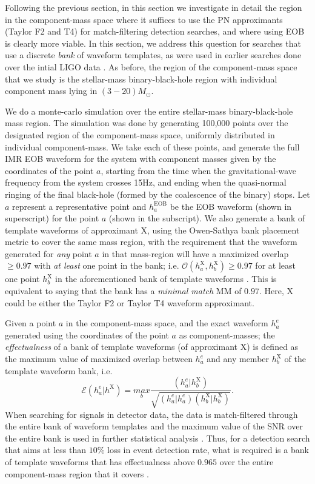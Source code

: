 \documentclass[aps,
prd,
amsmath,
amssymb,
twocolumn,
floatfix,
groupedaddress]{revtex4-1}
\newcommand{\EOB}{\mathrm{EOB}}
\newcommand{\Olap}{\mathcal{O}}
\newcommand{\X}{\mathrm{X}}
\begin{document}
Following the previous section, in this section we investigate in detail the region in the component-mass space where it suffices to use the PN approximants (Taylor F2 and T4) for match-filtering detection searches, and where using EOB is clearly more viable. In this section, we address this question for searches that use a discrete \textit{bank} \citep{SathyaBankPlacementTauN,SathyaMetric2PN} of waveform templates, as were used in earlier searches done over the intial LIGO data \citep{LSCSearch2004,LSCSearch2005,LSCSearch2008}. As before, the region of the component-mass space that we study is the stellar-mass binary-black-hole region with individual component mass lying in $(3-20)M_{\odot}$.

We do a monte-carlo simulation over the entire stellar-mass binary-black-hole mass region. The simulation was done by generating 100,000 points over the designated region of the component-mass space, uniformly distributed in individual component-mass. We take each of these points, and generate the full IMR EOB waveform for the system with component masses given by the coordinates of the point $a$, starting from the time when the gravitational-wave frequency from the system crosses 15Hz, and ending when the quasi-normal ringing of the final black-hole (formed by the coalescence of the binary) stops. Let $a$ represent a representative point and $h_a^{\EOB}$ be the EOB waveform (shown in superscript) for the point $a$ (shown in the subscript). We also generate a bank of template waveforms of approximant $\X$, using the Owen-Sathya bank placement metric \citep{OwenTemplateSpacing,SathyaBankPlacementTauN,SathyaMetric2PN} to cover the same mass region, with the requirement that the waveform generated for \textit{
any} point $a$ in that mass-region will have a maximized overlap $\geq 0.97$ with \textit{at least} one point in the bank; i.e. $\Olap(h^{\X}_a,h^{\X}_b)\geq 0.97$ for at least one point $h^{\X}_b$ in the aforementioned bank of template waveforms . This is equivalent to saying that the bank has a \textit{minimal match} $\mathrm{MM}$ of $0.97$. Here, $\X$ could be either the Taylor F2 or Taylor T4 waveform approximant.

Given a point $a$ in the component-mass space, and the exact waveform $h^e_a$ generated using the coordinates of the point $a$ as component-masses; the \textit{effectualness} of a bank of template waveforms (of approximant $\X$) is defined as the maximum value of maximized overlap between $h^e_a$ and any member $h^{\X}_b$ of the template waveform bank, i.e.
\begin{equation}
\mathcal{E}(h^e_a|h^{\X}) = \underset{b}{max}\dfrac{(h^e_a|h^{\X}_b)}{\sqrt{(h^e_a|h^e_a)(h^{\X}_b|h^{\X}_b)}}.
\end{equation}
When searching for signals in detector data, the data is match-filtered through the entire bank of waveform templates and the maximum value of the SNR over the entire bank is used in further statistical analysis \citep{LSCSearch2004,LSCSearch2005,LSCSearch2008}. Thus, for a detection search that aims at less than $10\%$ loss in event detection rate, what is required is a bank of template waveforms that has effectualness above $0.965$ over the entire component-mass region that it covers \citep{WaveformAccuracy2008,CompTemplates2009}.
\end{document}
